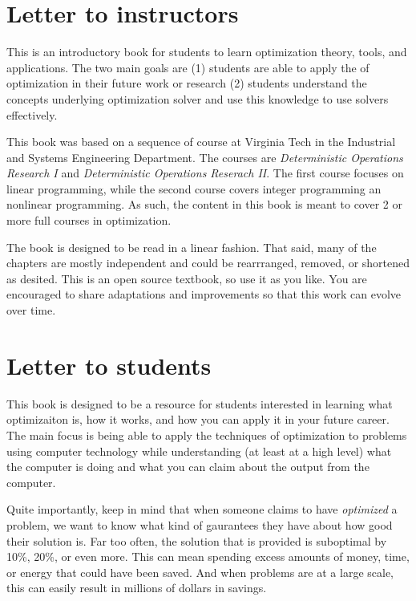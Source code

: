 \section*{Letter to instructors}
This is an introductory book for students to learn optimization theory, tools, and applications.  The two main goals are (1) students are able to apply the of optimization in their future work or research (2) students understand the concepts underlying optimization solver and use this knowledge to use solvers effectively.

This book was based on a sequence of course at Virginia Tech in the Industrial and Systems Engineering Department.   The courses are \emph{Deterministic Operations Research I} and \emph{Deterministic Operations Reserach II}.   The first course focuses on linear programming, while the second course covers integer programming an nonlinear programming.  As such, the content in this book is meant to cover 2 or more full courses in optimization.

The book is designed to be read in a linear fashion. That said, many of the chapters are mostly independent and could be rearrranged, removed, or shortened as desited.  This is an open source textbook, so use it as you like.  You are encouraged to share adaptations and improvements so that this work can evolve over time.




\section*{Letter to students}



This book is designed to be a resource for students interested in learning what optimizaiton is, how it works, and how you can apply it in your future career.  The main focus is being able to apply the techniques of optimization to problems using computer technology while understanding (at least at a high level) what the computer is doing and what you can claim about the output from the computer.

Quite importantly, keep in mind that when someone claims to have \emph{optimized} a problem, we want to know what kind of gaurantees they have about how good their solution is.  Far too often, the solution that is provided is suboptimal by 10\%, 20\%, or even more.  This can mean spending excess amounts of money, time, or energy that could have been saved. And when problems are at a large scale, this can easily result in millions of dollars in savings.

